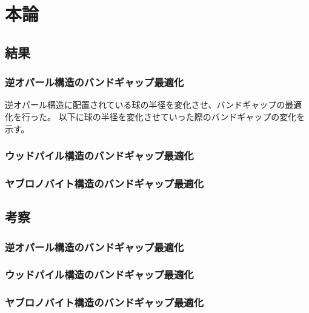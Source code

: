 \documentclass[platex,dvipdfmx]{jsreport}
\numberwithin{equation}{section}
\begin{document}
\chapter{本論}


\section{結果}
\subsection{逆オパール構造のバンドギャップ最適化}
逆オパール構造に配置されている球の半径を変化させ、バンドギャップの最適化を行った。
以下に球の半径を変化させていった際のバンドギャップの変化を示す。

\subsection{ウッドパイル構造のバンドギャップ最適化}
\subsection{ヤブロノバイト構造のバンドギャップ最適化}
\section{考察}
\subsection{逆オパール構造のバンドギャップ最適化}
\subsection{ウッドパイル構造のバンドギャップ最適化}
\subsection{ヤブロノバイト構造のバンドギャップ最適化}
\end{document}
